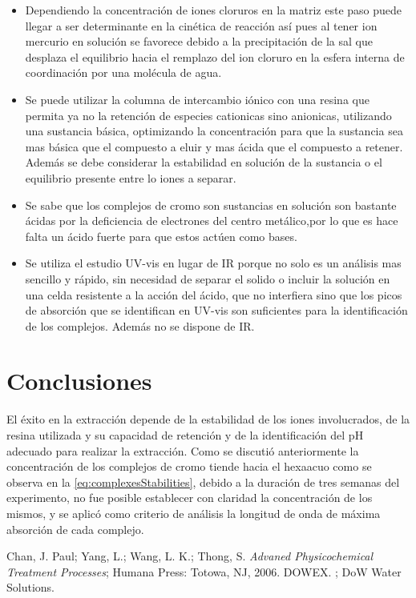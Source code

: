 \documentclass[fleqn,10pt]{SelfArx} %
\begin{document}
\begin{itemize}
	    \item Dependiendo la concentración de iones cloruros en la matriz este paso puede llegar a ser determinante en la cinética de reacción así pues al tener ion mercurio en solución se favorece debido a la precipitación de la sal  que desplaza el equilibrio hacia el remplazo del ion cloruro en la esfera interna de coordinación por una molécula de agua.
	    \item Se puede utilizar la columna de intercambio iónico con una resina que permita ya no la retención de especies cationicas sino anionicas, utilizando una sustancia básica, optimizando la concentración para que la sustancia sea mas básica que el compuesto a eluir y mas ácida que el compuesto a retener. Además se debe considerar la estabilidad en solución de la sustancia o el equilibrio presente entre lo iones a separar. 
	    \item Se sabe que los complejos de cromo son sustancias en solución son bastante ácidas por la deficiencia de electrones del centro metálico,por lo que es hace falta un ácido fuerte para que estos actúen como bases.
	    \item Se utiliza el estudio UV-vis en lugar de IR porque no solo es un análisis mas sencillo y rápido, sin necesidad de separar el solido o incluir la solución en una celda resistente a la acción del ácido, que no interfiera sino que los picos de absorción que se identifican en UV-vis son suficientes para la identificación de los complejos. Además no se dispone de IR.
	\end{itemize}

	\section{Conclusiones}
	El éxito en la extracción depende de la estabilidad de los iones involucrados, de la resina utilizada y su capacidad de retención y de la identificación del pH adecuado para realizar la extracción. Como se discuti\'o anteriormente la concentraci\'on de los complejos de cromo tiende hacia el hexaacuo como se observa en la \autoref{eq:complexesStabilities}, debido a la duraci\'on de tres semanas del experimento, no fue posible establecer con claridad la concentraci\'on de los mismos, y se aplic\'o como criterio de an\'alisis la longitud de onda de m\'axima absorci\'on de cada complejo.
	
	\begin{thebibliography}{9}
	    Chan, J. Paul; Yang, L.; Wang, L. K.; Thong, S. \textit{Advaned Physicochemical Treatment Processes}; Humana Press: Totowa, NJ, 2006. 
		DOWEX. ; DoW Water Solutions.
	\end{thebibliography}
\end{document}
